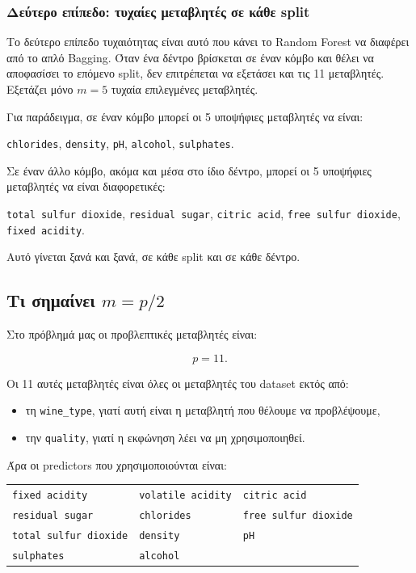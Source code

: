 \documentclass[12pt,a4paper]{article}
\newcommand{\code}[1]{\texttt{\textenglish{#1}}}
\begin{document}
\subsubsection{Δεύτερο επίπεδο: τυχαίες μεταβλητές σε κάθε split}

Το δεύτερο επίπεδο τυχαιότητας είναι αυτό που κάνει το Random Forest να
διαφέρει από το απλό Bagging. Όταν ένα δέντρο βρίσκεται σε έναν κόμβο και θέλει
να αποφασίσει το επόμενο split, δεν επιτρέπεται να εξετάσει και τις 11
μεταβλητές. Εξετάζει μόνο $m=5$ τυχαία επιλεγμένες μεταβλητές.

Για παράδειγμα, σε έναν κόμβο μπορεί οι 5 υποψήφιες μεταβλητές να είναι:

\begin{center}
\code{chlorides}, \code{density}, \code{pH}, \code{alcohol}, \code{sulphates}.
\end{center}

Σε έναν άλλο κόμβο, ακόμα και μέσα στο ίδιο δέντρο, μπορεί οι 5 υποψήφιες
μεταβλητές να είναι διαφορετικές:

\begin{center}
\code{total sulfur dioxide}, \code{residual sugar}, \code{citric acid},
\code{free sulfur dioxide}, \code{fixed acidity}.
\end{center}

Αυτό γίνεται ξανά και ξανά, σε κάθε split και σε κάθε δέντρο.

\subsection{Τι σημαίνει \texorpdfstring{$m=p/2$}{m=p/2}}

Στο πρόβλημά μας οι προβλεπτικές μεταβλητές είναι:

\[
    p = 11.
\]

Οι 11 αυτές μεταβλητές είναι όλες οι μεταβλητές του dataset εκτός από:

\begin{itemize}
    \item τη \code{wine\_type}, γιατί αυτή είναι η μεταβλητή που θέλουμε να
    προβλέψουμε,
    \item την \code{quality}, γιατί η εκφώνηση λέει να μη χρησιμοποιηθεί.
\end{itemize}

Άρα οι predictors που χρησιμοποιούνται είναι:

\begin{center}
\begin{tabular}{lll}
\toprule
\code{fixed acidity} & \code{volatile acidity} & \code{citric acid} \\
\code{residual sugar} & \code{chlorides} & \code{free sulfur dioxide} \\
\code{total sulfur dioxide} & \code{density} & \code{pH} \\
\code{sulphates} & \code{alcohol} & \\
\bottomrule
\end{tabular}
\end{center}
\end{document}
